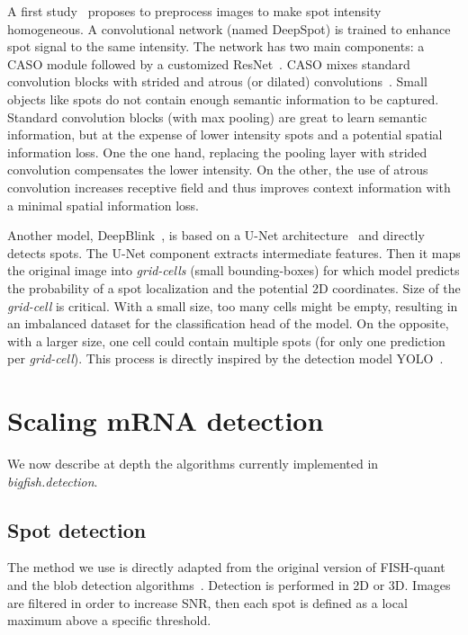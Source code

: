 A first study~\cite{bouilhol_deepspot_2022} proposes to preprocess images to make spot intensity homogeneous.
A convolutional network (named DeepSpot) is trained to enhance spot signal to the same intensity.
The network has two main components: a \ac{CASO} module followed by a customized ResNet~\cite{He_2016}.
\ac{CASO} mixes standard convolution blocks with strided and atrous (or dilated) convolutions~\cite{Hamaguchi_2018}.
Small objects like spots do not contain enough semantic information to be captured.
Standard convolution blocks (with max pooling) are great to learn semantic information, but at the expense of lower intensity spots and a potential spatial information loss.
One the one hand, replacing the pooling layer with strided convolution compensates the lower intensity.
On the other, the use of atrous convolution increases receptive field and thus improves context information with a minimal spatial information loss.

Another model, DeepBlink~\cite{eichenberger_deepblink_2021}, is based on a U-Net architecture~\cite{Ronneberger_2015} and directly detects spots.
The U-Net component extracts intermediate features.
Then it maps the original image into \emph{grid-cells} (small bounding-boxes) for which model predicts the probability of a spot localization and the potential 2D coordinates.
Size of the \emph{grid-cell} is critical.
With a small size, too many cells might be empty, resulting in an imbalanced dataset for the classification head of the model.
On the opposite, with a larger size, one cell could contain multiple spots (for only one prediction per \emph{grid-cell}).
This process is directly inspired by the detection model YOLO~\cite{Redmon_2016_CVPR}.

\section{Scaling mRNA detection}
\label{sec:method}

We now describe at depth the algorithms currently implemented in \emph{bigfish.detection}.

\subsection{Spot detection}
\label{subsec:spot_detection}

The method we use is directly adapted from the original version of FISH-quant~\cite{mueller_fish-quant_2013} and the blob detection algorithms~\cite{walt_scikit-image_2014}.
Detection is performed in 2D or 3D. Images are filtered in order to increase \ac{SNR}, then each spot is defined as a local maximum above a specific threshold.

